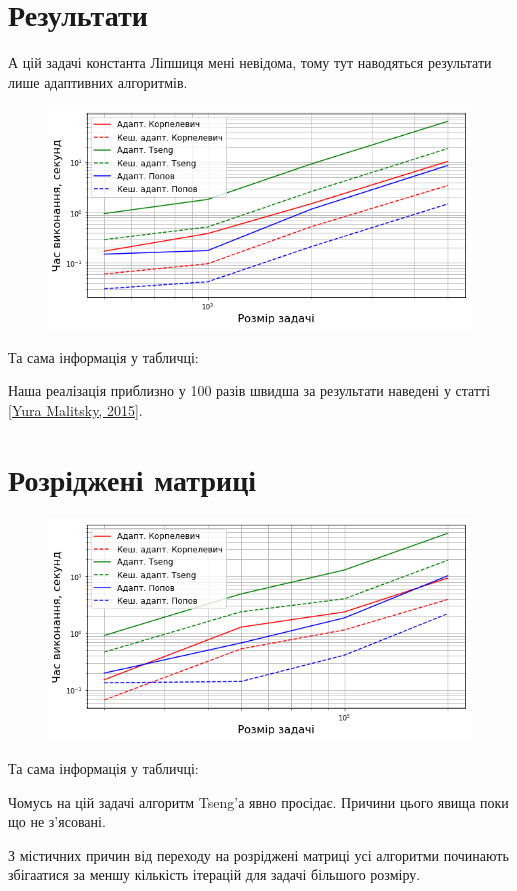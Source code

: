 \section{Результати}

А цій задачі константа Ліпшиця мені невідома, тому тут наводяться результати лише адаптивних алгоритмів.

\begin{figure}[H]
    \centering
    \includegraphics[width=.75\textwidth]{img/4/adapt/time.png}
\end{figure}

Та сама інформація у табличці:



\begin{remark}
    Наша реалізація приблизно у 100 разів швидша за результати наведені у статті \href{https://arxiv.org/abs/1502.04968v1}{[Yura Malitsky, 2015]}. 
\end{remark}



\section{Розріджені матриці}

\begin{figure}[H]
    \centering
    \includegraphics[width=.75\textwidth]{img/4/sparse/adapt/time.png}
\end{figure}

Та сама інформація у табличці:





\begin{remark}
    Чомусь на цій задачі алгоритм Tseng'а явно просідає. Причини цього явища поки що не з'ясовані.
\end{remark}

\begin{remark}
    З містичних причин від переходу на розріджені матриці усі алгоритми починають збігаатися за меншу кількість ітерацій для задачі більшого розміру.
\end{remark}

